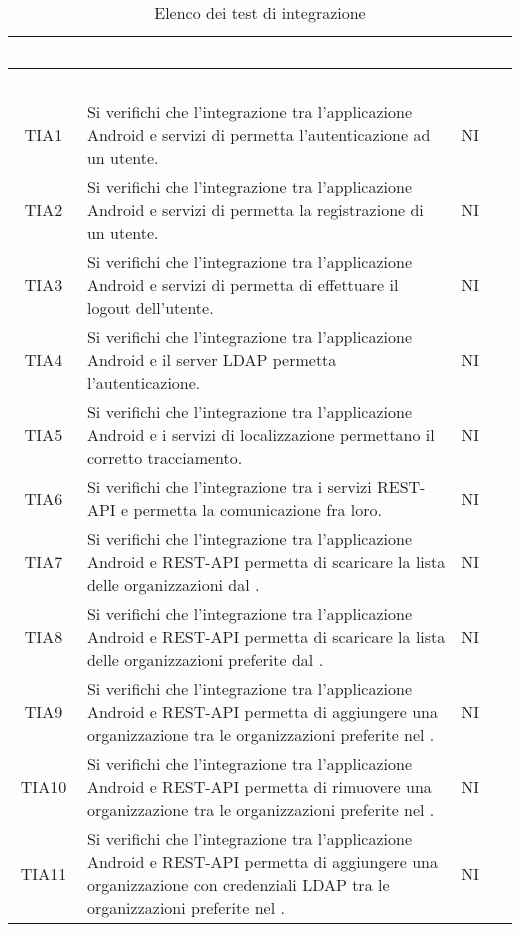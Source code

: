 {
\renewcommand{\arraystretch}{1.5}
\centering
\begin{longtable}{ c C{13cm} C{1cm}}
\caption{Elenco dei test di integrazione}\\
\textcolor{white}{\textbf{Codice}} & \textcolor{white}{\textbf{Descrizione}} & \textcolor{white}{\textbf{Stato}}\\
\endfirsthead
{}
\textcolor{white}{\textbf{Codice}} & \textcolor{white}{\textbf{Descrizione}} & \textcolor{white}{\textbf{Stato}}\\
\endhead

TIA1 & Si verifichi che l’integrazione tra l’applicazione Android e servizi di  permetta l’autenticazione ad un utente. & NI \\
TIA2 & Si verifichi che l’integrazione tra l’applicazione Android e servizi di  permetta la registrazione di un utente. & NI \\
TIA3 & Si verifichi che l’integrazione tra l’applicazione Android e servizi di  permetta di effettuare il logout dell'utente. & NI \\
TIA4 & Si verifichi che l’integrazione tra l’applicazione Android e il server LDAP permetta l’autenticazione. & NI \\
TIA5 & Si verifichi che l’integrazione tra l’applicazione Android e i servizi di localizzazione permettano il corretto tracciamento. & NI \\
TIA6 & Si verifichi che l’integrazione tra i servizi REST-API e  permetta la comunicazione fra loro. & NI \\
TIA7 & Si verifichi che l’integrazione tra l’applicazione Android e REST-API permetta di scaricare la lista delle organizzazioni dal . & NI \\
TIA8 & Si verifichi che l’integrazione tra l’applicazione Android e REST-API permetta di scaricare la lista delle organizzazioni preferite dal . & NI \\
TIA9 & Si verifichi che l’integrazione tra l’applicazione Android e REST-API permetta di aggiungere una organizzazione tra le organizzazioni preferite nel . & NI \\
TIA10 & Si verifichi che l’integrazione tra l’applicazione Android e REST-API permetta di rimuovere una organizzazione tra le organizzazioni preferite nel . & NI \\
TIA11 & Si verifichi che l’integrazione tra l’applicazione Android e REST-API permetta di aggiungere una organizzazione con credenziali LDAP tra le organizzazioni preferite nel . & NI \\

\end{longtable}}
